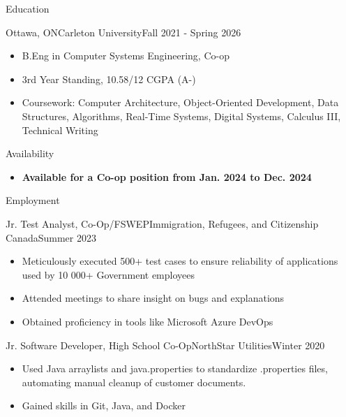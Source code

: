 \documentclass[]{mcdowellcv}
\begin{document}
	\makeheader
		
	\begin{cvsection}{Education}
		\begin{cvsubsection}{Ottawa, ON}{Carleton University}{Fall 2021 - Spring 2026}
			\begin{itemize}
				\item B.Eng in Computer Systems Engineering, Co-op
				\item 3rd Year Standing, 10.58/12 CGPA (A-)
				\item Coursework: Computer Architecture, Object-Oriented Development, Data Structures, Algorithms, Real-Time Systems, Digital Systems, Calculus III, Technical Writing
			\end{itemize}
		\end{cvsubsection}
	\end{cvsection}

	\begin{cvsection}{Availability}
		\begin{cvsubsection}{}{}{}
			\begin{itemize}
				\item \textbf{Available for a Co-op position from Jan. 2024 to Dec. 2024}
			\end{itemize}
		\end{cvsubsection}
	\end{cvsection}

	\begin{cvsection}{Employment}
		\begin{cvsubsection}{Jr. Test Analyst, Co-Op/FSWEP}{Immigration, Refugees, and Citizenship Canada}{Summer 2023}			
			\begin{itemize}
				\item Meticulously executed 500+ test cases to ensure reliability of applications used by 10 000+ Government employees
				\item Attended meetings to share insight on bugs and explanations 
				\item Obtained proficiency in tools like Microsoft Azure DevOps 
			\end{itemize}
		\end{cvsubsection}
		
			\begin{cvsubsection}{Jr. Software Developer, High School Co-Op}{NorthStar Utilities}{Winter 2020}	
			\begin{itemize}
				\item Used Java arraylists and java.properties to standardize .properties files, automating manual cleanup of customer documents.
				\item Gained skills in Git, Java, and Docker
			\end{itemize}
		\end{cvsubsection}
		
	\end{cvsection}
	
\end{document}
